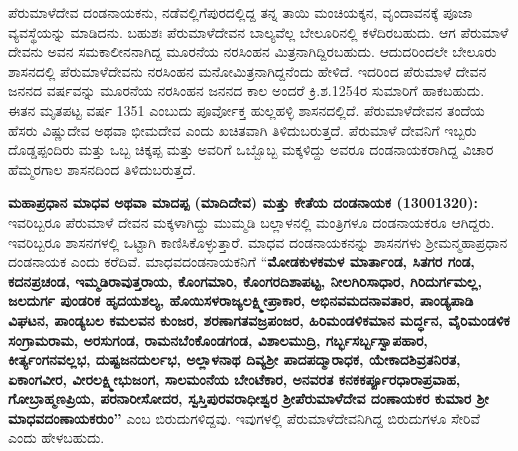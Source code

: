 ಪೆರುಮಾಳೆದೇವ ದಂಡನಾಯಕನು, ನಡೆವಲ್ಲಿಗೆಪುರದಲ್ಲಿದ್ದ ತನ್ನ ತಾಯಿ ಮಂಚಿಯಕ್ಕನ, ವೃಂದಾವನಕ್ಕೆ ಪೂಜಾ ವ್ಯವಸ್ಥೆ\-ಯನ್ನು ಮಾಡಿದನು. ಬಹುಶಃ ಪೆರುಮಾಳೆದೇವನ ಬಾಲ್ಯವೆಲ್ಲ ಬೇಲೂರಿನಲ್ಲಿ ಕಳೆದಿರಬಹುದು. ಆಗ ಪೆರುಮಾಳೆ ದೇವನು ಅವನ ಸಮಕಾಲೀನನಾಗಿದ್ದ ಮೂರನೆಯ ನರಸಿಂಹನ ಮಿತ್ರನಾಗಿದ್ದಿರಬಹುದು. ಆದುದರಿಂದಲೇ ಬೇಲೂರು ಶಾಸನದಲ್ಲಿ ಪೆರುಮಾಳೆದೇವನು ನರಸಿಂಹನ ಮನೋಮಿತ್ರನಾಗಿದ್ದನೆಂದು ಹೇಳಿದೆ. ಇದರಿಂದ ಪೆರುಮಾಳೆ ದೇವನ ಜನನದ ವರ್ಷವನ್ನು ಮೂರನೆಯ ನರಸಿಂಹನ ಜನನದ ಕಾಲ ಅಂದರೆ ಕ್ರಿ.ಶ.1254ರ ಸುಮಾರಿಗೆ ಹಾಕಬಹುದು. ಈತನ ಮೃತಪಟ್ಟ ವರ್ಷ 1351 ಎಂಬುದು ಪೂರ್ವೋಕ್ತ ಹುಲ್ಲಹಳ್ಳಿ ಶಾಸನದಲ್ಲಿದೆ. ಪೆರುಮಾಳೆದೇವನ ತಂದೆಯ ಹೆಸರು ವಿಷ್ಣುದೇವ ಅಥವಾ ಭೀಮದೇವ ಎಂದು ಖಚಿತವಾಗಿ ತಿಳಿದುಬರುತ್ತದೆ. ಪೆರುಮಾಳೆ ದೇವನಿಗೆ ಇಬ್ಬರು ದೊಡ್ಡಪ್ಪಂದಿರು ಮತ್ತು ಒಬ್ಬ ಚಿಕ್ಕಪ್ಪ ಮತ್ತು ಅವರಿಗೆ ಒಬ್ಬೊಬ್ಬ ಮಕ್ಕಳಿದ್ದು ಅವರೂ ದಂಡನಾಯಕರಾಗಿದ್ದ ವಿಚಾರ ಹೆಮ್ಮರಗಾಲ ಶಾಸನದಿಂದ ತಿಳಿದುಬರುತ್ತದೆ.

\textbf{ಮಹಾಪ್ರಧಾನ ಮಾಧವ ಅಥವಾ ಮಾದಪ್ಪ (ಮಾದಿದೇವ) ಮತ್ತು ಕೇತೆಯ ದಂಡನಾಯಕ (1300\general{\enginline{-}}1320): } ಇವರಿಬ್ಬರೂ ಪೆರುಮಾಳೆ ದೇವನ ಮಕ್ಕಳಾಗಿದ್ದು ಮುಮ್ಮಡಿ ಬಲ್ಲಾಳನಲ್ಲಿ ಮಂತ್ರಿಗಳೂ ದಂಡನಾಯಕರೂ ಆಗಿದ್ದರು. ಇವರಿಬ್ಬರೂ ಶಾಸನಗಳಲ್ಲಿ ಒಟ್ಟಾಗಿ ಕಾಣಿಸಿಕೊಳ್ಳುತ್ತಾರೆ. ಮಾಧವ ದಂಡನಾಯಕನನ್ನು ಶಾಸನಗಳು ಶ‍್ರೀಮನ್ಮಹಾಪ್ರಧಾನ ದಂಡನಾಯಕ ಎಂದು ಕರೆದಿವೆ. ಮಾಧವದಂಡನಾಯಕನಿಗೆ “\textbf{ಮೋಡಕುಳಕಮಳ ಮಾರ್ತಾಂಡ, ಸಿತಗರ ಗಂಡ, ಕದನಪ್ರಚಂಡ,\general{\break } ಇಮ್ಮಡಿರಾವುತ್ತರಾಯ, ಕೊಂಗಮಾರಿ, ಕೊಂಗರದಿಶಾಪಟ್ಟ, ನೀಲಗಿರಿಸಾಧಾರ, ಗಿರಿದುರ್ಗಮಲ್ಲ, ಜಲದುರ್ಗ ಪುಂಡರಿಕ ಹೃದಯಶಲ್ಯ, ಹೊಯಿಸಳರಾಜ್ಯಲಕ್ಷ್ಮೀಪ್ರಾಕಾರ, ಅಭಿನವಮದನಾವತಾರ, ಪಾಂಡ್ಯಪಾಡಿ ವಿಘಟನ, ಪಾಂಡ್ಯಬಲ ಕಮಲವನ ಕುಂಜರ, ಶರಣಾಗತವಜ್ರಪಂಜರ, ಹಿರಿಮಂಡಳಿಕಮಾನ ಮರ್ದ್ಧನ, ವೈರಿಮಂಡಳಿಕ ಸಂಗ್ರಾಮರಾಮ, ಅರಸುಗಂಡ,\general{\break } ರಾಮನಬೆಂಕೊಂಡಗಂಡ, ವಿಶಾಲಮುದ್ರಿ, ಗರ್ಬ್ಭಸರ್ಬ್ಬಸ್ವಾಪಹಾರ, ಕೀರ್ತ್ಯಂಗನವಲ್ಲಭ, ದುಷ್ಟಜನದುರ್ಲಭ, ಅಲ್ಲಾಳನಾಥ ದಿವ್ಯಶ‍್ರೀ ಪಾದಪದ್ಮಾರಾಧಕ, ಯೇಕಾದಶಿವ್ರತನಿರತ, ಏಕಾಂಗವೀರ, ವೀರಲಕ್ಷ್ಮೀಭುಜಂಗ, ಸಾಲಮಂನೆಯ ಬೇಂಟೆಕಾರ, ಅನವರತ ಕನಕಕರ್ಪ್ಪೂರಧಾರಾಪ್ರವಾಹ, ಗೋಬ್ರಾಹ್ಮಣಪ್ರಿಯ, ಪರನಾರೀಸೋದರ, ಸ್ವಸ್ತಿಪುರವರಾಧೀಶ್ವರ\general{\break } ಶ‍್ರೀಪೆರುಮಾಳೆದೇವ ದಂಣಾಯಕರ ಕುಮಾರ ಶ‍್ರೀ ಮಾಧವದಂಣಾಯಕರುಂ”} ಎಂಬ ಬಿರುದುಗಳಿದ್ದವು. ಇವುಗಳಲ್ಲಿ ಪೆರುಮಾಳೆದೇವನಿಗಿದ್ದ ಬಿರುದುಗಳೂ ಸೇರಿವೆ ಎಂದು ಹೇಳಬಹುದು.

\newpage


